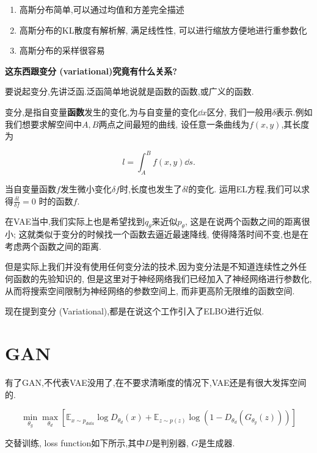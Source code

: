 	\begin{enumerate}
		\item 高斯分布简单,可以通过均值和方差完全描述
		\item 高斯分布的KL散度有解析解, 满足线性性, 可以进行缩放方便地进行重参数化
		\item 高斯分布的采样很容易
	\end{enumerate}
	
	\textbf{这东西跟变分 (variational)究竟有什么关系?}
	
	要说起变分,先讲泛函.泛函简单地说就是函数的函数,或广义的函数.

	变分,是指自变量\textbf{函数}发生的变化,为与自变量的变化$\dd x$区分,
	我们一般用$\delta$表示.例如我们想要求解空间中$A, B$两点之间最短的曲线,
	设任意一条曲线为$f(x, y)$,其长度为

	\begin{equation}
		l = \int_{A}^{B} f(x,  y) \dd s.
	\end{equation}

	当自变量函数$f$发生微小变化$\delta f$时,长度也发生了$\delta l$的变化.
	运用EL方程,我们可以求得$\frac{\delta l}{\delta f} = 0$
	时的函数$f$.
	
	在VAE当中,我们实际上也是希望找到$q_\theta$来近似$p_{\theta}$,
	这是在说两个函数之间的距离很小;
	这就类似于变分的时候找一个函数去逼近最速降线,
	使得降落时间不变,也是在考虑两个函数之间的距离.

	但是实际上我们并没有使用任何变分法的技术,因为变分法是不知道连续性之外任何函数的先验知识的,
	但是这里对于神经网络我们已经加入了神经网络进行参数化,从而将搜索空间限制为神经网络的参数空间上,
	而非更高阶无限维的函数空间.

	现在提到变分 (Variational),都是在说这个工作引入了ELBO进行近似.

	\section{GAN}

	有了GAN,不代表VAE没用了,在不要求清晰度的情况下,VAE还是有很大发挥空间的.
	
	\begin{equation}
		\min _{\theta_{g}} \max _{\theta_{d}}\left[\mathbb{E}_{x \sim p_{d a t a}} \log D_{\theta_{d}}(x)+\mathbb{E}_{z \sim p(z)} \log \left(1-D_{\theta_{d}}\left(G_{\theta_{g}}(z)\right)\right)\right]
	\end{equation}

	交替训练, loss function如下所示,其中$D$是判别器, $G$是生成器.

